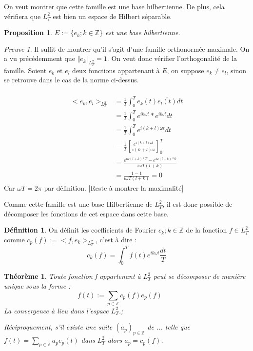 \documentclass[]{article}
\newtheorem{mythm}{Théorème}
\newtheorem{myproposition}{Proposition}
\theoremstyle{remark}
\newtheorem{myproof}{Preuve}
\theoremstyle{definition}
\newtheorem{mydef}{Définition}
\begin{document}
			
			On veut montrer que cette famille est une base hilbertienne. De plus, cela vérifiera que $L_T^2$ est bien un espace de Hilbert séparable. 
			
			\begin{myproposition}
				$E:= \{e_k; k \in \mathbb{Z} \}$ est une base hilbertienne.
			\end{myproposition}
			
			\begin{myproof}	
				
				Il suffit de montrer qu'il s'agit d'une famille orthonormée maximale.
				On a vu précédemment que $\Vert e_k\Vert_{L_T^2} = 1$. On veut donc vérifier l'orthogonalité de la famille. 
				Soient $e_k$ et $e_l$ deux fonctions appartenant à $E$, on suppose $e_k\ne e_l$, sinon se retrouve dans le cas de la norme ci-dessus.  
				
				\begin{align*}
				\\	<e_k, e_l>_{L_T^2} & = \frac{1}{T} \int_0^T e_k(t) \overline{e_l(t)}dt 
				\\ & = \frac{1}{T} \int_0^T e^{ik\omega t} * e^{il\omega t} dt 
				\\ & = \frac{1}{T} \int_0^T e^{i(k+l)\omega t} dt 
				\\ & = \frac{1}{T}  \left[ \frac {e^{i(k+l)\omega t}} {{i(k+l)\omega}} \right] _0^T
				\\ & = \frac {e^{i\omega (l + k)*T} - e^{i\omega(l + k) * 0}} {i\omega T(l + k)}
				\\ & = \frac {1 - 1}{i\omega T(l + k)} = 0
				\end{align*}
				Car $\omega T = 2\pi$ par définition.
				[Reste à montrer la maximalité]
				
				
			\end{myproof}
			
		Comme cette famille est une base Hilbertienne de $L_T^2$, il est donc possible de décomposer les fonctions de cet espace dans cette base. 
			\begin{mydef}
				On définit les coefficients de Fourier ${c_k; k \in \mathbb{Z} }$ {}de la fonction  $ f \in L_T^2 $ comme $ c_p(f):=<f, e_k>_{L^2_T} $, c'est à dire : 
					$$ c_k(f) = \int_{0}^{T} f(t) e^{ik\omega t} \frac{dt}{T} $$
			\end{mydef}
			
			\begin{mythm}
				Toute fonction f appartenant à $L^2_T$ peut se décomposer de manière unique sous la forme : 
				$$f(t):= \sum_{p \in \mathbb{Z}} c_p(f)e_p(f) \qquad $$
				La convergence à lieu dans l'espace $L^2_T$.;
				
				Réciproquement, s'il existe une suite $(a_p)_{p \in \mathbb{Z}}$ de  ... telle que $f(t) = \sum_{p\in \mathbb{Z}}a_p e_p(t)$ dans $L^2_T$ alors $a_p=c_p(f)$.
			\end{mythm}
			
\end{document}
